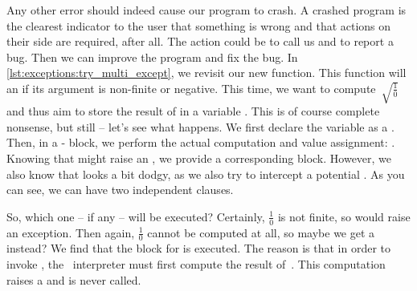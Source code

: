 Any other error should indeed cause our program to crash.
A crashed program is the clearest indicator to the user that something is wrong and that actions on their side are required, after all.
The action could be to call us and to report a bug.
Then we can improve the program and fix the bug.%
%
%
%
%
%
%
In \cref{lst:exceptions:try_multi_except}, we revisit our new  function.
This function will  an  if its argument is non-finite or negative.
This time, we want to compute~$\sqrt{\frac{1}{0}}$ and thus aim to store the result of  in a variable .
This is of course complete nonsense, but still -- let's see what happens.
We first declare the variable as a .
Then, in a - block, we perform the actual computation and value assignment: .
Knowing that  might raise an , we provide a corresponding  block.
However, we also know that  looks a bit dodgy, as we also try to intercept a potential .
As you can see, we can have two independent  clauses.

So, which one -- if any -- will be executed?
Certainly, $\frac{1}{0}$ is not finite, so  would raise an exception.
Then again, $\frac{1}{0}$ cannot be computed at all, so maybe we get a  instead?
We find that the  block for  is executed.
The reason is that in order to invoke , the \python\ interpreter must first compute the result of~.
This computation raises a  and  is never called.

